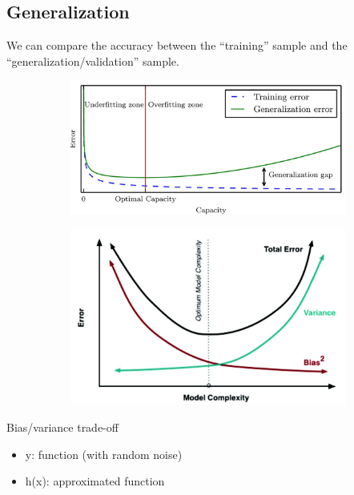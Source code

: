 \subsection{Generalization}

We can compare the accuracy between the “training” sample and the “generalization/validation” sample.\\

\begin{figure}[ht]
	\centering
	\begin{subfigure}{.5\textwidth}
		\centering
		\includegraphics[width=1\linewidth]{figure_ml/generalization.png}
	\end{subfigure}%
	\begin{subfigure}{.5\textwidth}
		\centering
		\includegraphics[width=1\linewidth]{figure_ml/generalization2.png}
	\end{subfigure}
	
\end{figure}



Bias/variance trade-off
\begin{itemize}
	\item y: function (with random noise)
	\item h(x): approximated function
\end{itemize}


